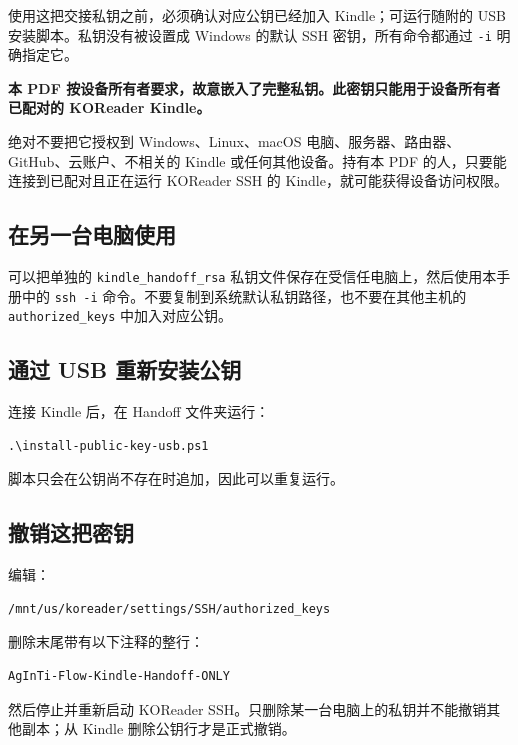 \documentclass[10pt,a4paper]{article}
\begin{document}
使用这把交接私钥之前，必须确认对应公钥已经加入 Kindle；可运行随附的 USB 安装脚本。私钥没有被设置成 Windows 的默认 SSH 密钥，所有命令都通过 \texttt{-i} 明确指定它。

\begin{warningbox}
\textbf{本 PDF 按设备所有者要求，故意嵌入了完整私钥。此密钥只能用于设备所有者已配对的 KOReader Kindle。}

绝对不要把它授权到 Windows、Linux、macOS 电脑、服务器、路由器、GitHub、云账户、不相关的 Kindle 或任何其他设备。持有本 PDF 的人，只要能连接到已配对且正在运行 KOReader SSH 的 Kindle，就可能获得设备访问权限。
\end{warningbox}

\subsection{在另一台电脑使用}

可以把单独的 \texttt{kindle\_handoff\_rsa} 私钥文件保存在受信任电脑上，然后使用本手册中的 \texttt{ssh -i} 命令。不要复制到系统默认私钥路径，也不要在其他主机的 \texttt{authorized\_keys} 中加入对应公钥。

\subsection{通过 USB 重新安装公钥}

连接 Kindle 后，在 Handoff 文件夹运行：

\begin{Verbatim}[fontsize=\small]
.\install-public-key-usb.ps1
\end{Verbatim}

脚本只会在公钥尚不存在时追加，因此可以重复运行。

\subsection{撤销这把密钥}

编辑：

\begin{Verbatim}[fontsize=\small]
/mnt/us/koreader/settings/SSH/authorized_keys
\end{Verbatim}

删除末尾带有以下注释的整行：

\begin{Verbatim}[fontsize=\small]
AgInTi-Flow-Kindle-Handoff-ONLY
\end{Verbatim}

然后停止并重新启动 KOReader SSH。只删除某一台电脑上的私钥并不能撤销其他副本；从 Kindle 删除公钥行才是正式撤销。
\end{document}
